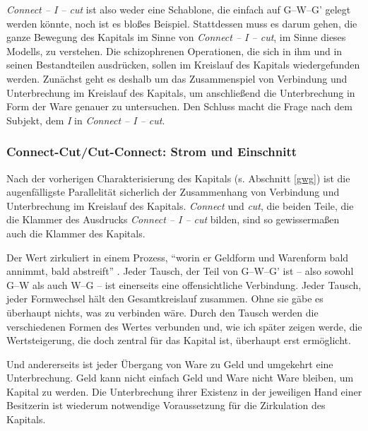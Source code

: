 \documentclass[12pt,
               DIV13,
               paper=a4,
               twoside=false,
               onehalfspacing,
               bibliography=totoc,
               toc=graduated,
               draft,
               ]{scrartcl}
\newcommand{\pc}[2]{\parencite[#1]{#2}}
\newcommand{\worries}[1]{\ifdraft{\textcolor{blue}{\texttt{(#1)}}}{}}
\newcommand{\gwg}{G--W--G'\xspace}
\newcommand{\cic}{Connect -- I -- cut\xspace}
\begin{document}
\emph{\cic} ist also weder eine Schablone, die einfach auf \gwg gelegt
werden könnte, noch ist es bloßes Beispiel. Stattdessen muss es darum
gehen, die ganze Bewegung des Kapitals im Sinne von \emph{\cic}, im
Sinne dieses Modells, zu verstehen. Die schizophrenen Operationen, die
sich in ihm und in seinen Bestandteilen ausdrücken, sollen im
Kreislauf des Kapitals wiedergefunden werden. Zunächst geht es deshalb
um das Zusammenspiel von Verbindung und Unterbrechung im Kreislauf des
Kapitals, um anschließend die Unterbrechung in Form der Ware genauer
zu untersuchen. Den Schluss macht die Frage nach dem Subjekt, dem
\emph{I} in \emph{\cic}.



\subsubsection{Connect-Cut/Cut-Connect: Strom und Einschnitt}


Nach der vorherigen Charakterisierung des Kapitals (s. Abschnitt \ref{gwg}) ist
die augenfälligste Parallelität sicherlich der Zusammenhang von
Verbindung und Unterbrechung im Kreislauf des Kapitals. \emph{Connect}
und \emph{cut}, die beiden Teile, die die Klammer des Ausdrucks \emph{\cic}
bilden, sind so gewissermaßen auch die Klammer des Kapitals.


Der Wert zirkuliert in einem Prozess, "`worin er Geldform und
Warenform bald annimmt, bald abstreift"' \pc{169}{kap}. Jeder Tausch,
der Teil von \gwg ist -- also sowohl G--W als auch W--G -- ist
einerseits eine offensichtliche Verbindung. Jeder Tausch, jeder
Formwechsel hält den Gesamtkreislauf zusammen. Ohne sie gäbe es
überhaupt nichts, was zu verbinden wäre. Durch den Tausch werden die
verschiedenen Formen des Wertes verbunden und, wie ich später zeigen
werde, die Wertsteigerung, die doch zentral für das Kapital ist,
überhaupt erst ermöglicht.


Und andererseits ist jeder Übergang von Ware zu Geld und umgekehrt
eine Unterbrechung. Geld kann nicht einfach Geld und Ware nicht Ware
bleiben, um Kapital zu werden. Die Unterbrechung ihrer Existenz in der
jeweiligen Hand einer Besitzerin ist wiederum notwendige
Voraussetzung für die Zirkulation des Kapitals.
\end{document}
